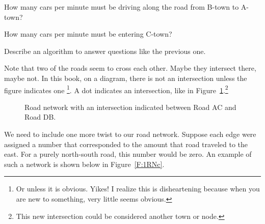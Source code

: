 
\begin{alevel}
How many cars per minute must be driving along the road from B-town to A-town?
\end{alevel}

\begin{clevel}
How many cars per minute must be entering C-town?
\end{clevel}

\begin{dlevel}
Describe an algorithm to answer questions like the previous one.
\end{dlevel}

\noindent
Note that two of the roads seem to cross each other. Maybe they intersect there, maybe not. In this book, on a diagram, there is not an intersection unless the figure indicates one \footnote{Or unless it is obvious. Yikes! I realize this is disheartening because when you are new to something, very little seems obvious.}. A dot indicates an intersection, like in Figure~\ref{F:1RNb}.\footnote{This new intersection could be considered another town or node.}\par
\par
\begin{figure}[H]
\begin{center}
\caption{Road network with an intersection indicated between Road AC and Road DB.}
\label{F:1RNb}
\end{center}
\end{figure}
\par

We need to include one more twist to our road network. Suppose each edge were assigned a number that corresponded to the amount that road traveled to the east. For a purely north-south road, this number would be zero. An example of such a network is shown below in Figure~\ref{F:1RNc}.

